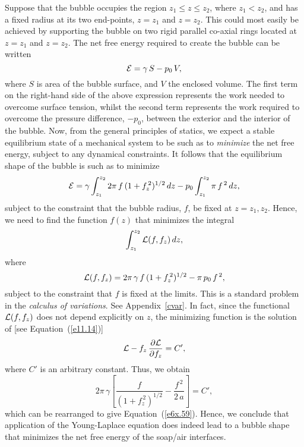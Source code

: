 Suppose that the bubble occupies the region $z_1\leq z\leq z_2$, where $z_1<z_2$, and has a fixed
radius at its two end-points, $z=z_1$ and $z=z_2$. 
This could most easily be achieved by supporting the
bubble on two rigid parallel co-axial rings located at $z=z_1$ and $z=z_2$. 
The net free energy required to create the bubble  can be written
\begin{equation}
{\cal E} = \gamma\,S - p_0\,V,
\end{equation}
where $S$ is area of the bubble surface, and $V$ the enclosed volume. The first term on the right-hand side of
the above expression represents the work needed to overcome surface tension, whilst the second term
represents the work required to overcome the  pressure difference, $-p_0$, between the exterior and
the interior of the bubble. Now, from the general principles of statics, we  expect a stable equilibrium state
of a mechanical system to be such as to {\em minimize}\/ the net free energy, subject to any dynamical
constraints.  It follows that the equilibrium shape of the bubble 
is such as to minimize
\begin{equation}
{\cal E} = \gamma\int_{z_1}^{z_2} 2\pi\,f\,(1+f_z^{\,2})^{1/2}\,dz-p_0\int_{z_1}^{z_2}\pi\,f^{\,2}\,dz,
\end{equation}
subject to the constraint that the bubble radius, $f$, be fixed at $z=z_1, z_2$.
Hence, we need to find the function $f(z)$ that minimizes the integral
\begin{equation}
\int_{z_1}^{z_2} {\cal L}(f,f_z)\,dz,
\end{equation}
where
\begin{equation}
{\cal L}(f,f_z) = 2\pi\,\gamma\,f\,(1+f_z^{\,2})^{1/2} - \pi\,p_0\,f^{\,2},
\end{equation}
subject to the constraint that $f$ is fixed at the limits. This is a standard problem in the {\em calculus of
variations}. See Appendix~\ref{cvar}. In fact, since the functional ${\cal L}(f,f_z)$ does not depend explicitly
on $z$, the minimizing function is the solution of [see Equation~(\ref{e11.14})]
\begin{equation}
{\cal L}-f_z\,\frac{\partial {\cal L}}{\partial f_z}  = C',
\end{equation}
where $C'$ is an arbitrary constant. 
Thus, we obtain 
\begin{equation}
2\pi\,\gamma\left[\frac{f}{(1+f_z^{\,2})^{1/2}}-\frac{f^{\,2}}{2\,a}\right] = C',
\end{equation}
which can be rearranged to give Equation~(\ref{e6x.59}). Hence, we conclude that application of the Young-Laplace
equation does indeed lead to a bubble shape that minimizes the net free energy of the soap/air interfaces.

